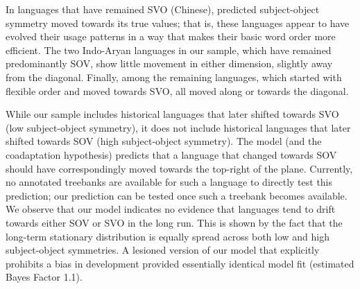 \documentclass[11pt,a4paper]{article}
\newcommand\comment[1]{{\color{red}#1}}
\newcommand\mhahn[1]{{\color{red}(#1)}}
\begin{document}
In languages that have remained SVO (Chinese), predicted subject-object symmetry moved towards its true values; that is, these languages appear to have evolved their usage patterns in a way that makes their basic word order more efficient.
The two Indo-Aryan languages in our sample, which have remained predominantly SOV, show little movement in either dimension, slightly away from the diagonal.
Finally, among the remaining languages, which started with flexible order and moved towards SVO, all moved along or towards the diagonal.



While our sample includes historical languages that later shifted towards SVO (low subject-object symmetry), it does not include historical languages that later shifted towards SOV (high subject-object symmetry).
The model (and the coadaptation hypothesis) predicts that a language that changed towards SOV should have correspondingly moved towards the top-right of the plane. 
Currently, no annotated treebanks are available for such a language to directly test this prediction; our prediction can be tested once such a treebank becomes available.
We observe that our model indicates no evidence that languages tend to drift towards either SOV or SVO in the long run.
This is shown by the fact that the long-term stationary distribution is equally spread across both low and high subject-object symmetries.
A lesioned version of our model that explicitly prohibits a bias in development provided essentially identical model fit (estimated Bayes Factor 1.1).
\end{document}
